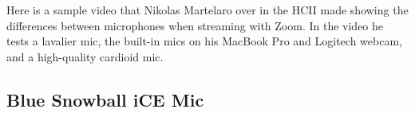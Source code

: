 \begin{gram}
\label{grm:equipment::mics::comparison}
Here is a sample video that Nikolas Martelaro over in the HCII made showing the differences between microphones when streaming with Zoom. In the video he tests a lavalier mic, the built-in mics on his MacBook Pro and Logitech webcam, and a high-quality cardioid mic.

\end{gram}

\subsection{Blue Snowball iCE Mic}
\label{sec:equipment::bluesnow}

